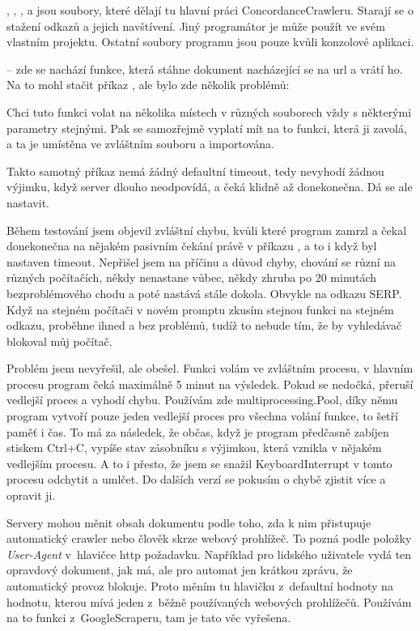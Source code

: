 \od 
{}, , ,  a 
jsou soubory, které dělají tu hlavní práci ConcordanceCrawleru. Starají se
o stažení odkazů a jejich navštívení. Jiný programátor je může použít ve
svém vlastním projektu. Ostatní soubory programu jsou pouze kvůli konzolové
aplikaci.

\od
{} -- zde se nachází funkce, která stáhne dokument
nacházející se na url a vrátí ho. Na to mohl stačit
příkaz , ale bylo zde několik problémů:

\bigskip
\odod
	Chci tuto funkci volat na několika místech v různých souborech vždy s
	některými parametry stejnými. Pak se samozřejmě vyplatí mít na to funkci,
	která ji zavolá, a ta je umístěna ve zvláštním souboru a importována.

\bigskip
\odod
	Takto samotný příkaz nemá žádný defaultní timeout, tedy nevyhodí žádnou
	výjimku, když server dlouho neodpovídá, a čeká klidně až donekonečna. Dá se ale
	nastavit.

	\bigskip
\odod
	Během testování jsem objevil zvláštní chybu, kvůli které program zamrzl
	a čekal donekonečna na nějakém pasivním čekání právě v příkazu
	, a to i když byl nastaven timeout.	Nepřišel jsem na příčinu
	a důvod chyby, chování se různí na různých počítačích, někdy nenastane
	vůbec, někdy zhruba po 20 minutách bezproblémového chodu a poté nastává
	stále dokola. Obvykle na odkazu SERP.  Když na stejném počítači v novém
	promptu zkusím stejnou funkci na stejném odkazu, proběhne ihned a bez
	problémů, tudíž to nebude tím, že by vyhledávač blokoval můj počítač.

\bigskip
\itemitem{}
	Problém jsem nevyřešil, ale obešel. Funkci volám ve zvláštním procesu,
	v hlavním procesu program čeká maximálně 5 minut na výsledek. Pokud se
	nedočká, přeruší vedlejší proces a vyhodí chybu. Používám
	zde multiprocessing.Pool, díky němu program vytvoří pouze jeden
	vedlejší proces pro všechna volání funkce, to šetří paměť i čas.
	To má za následek, že občas, když je program předčasně zabíjen stiskem
	Ctrl+C, vypíše stav zásobníku s výjimkou, která vznikla v nějakém
	vedlejším procesu. A to i přesto, že jsem se snažil KeyboardInterrupt
	v tomto procesu odchytit a umlčet. Do dalších verzí se pokusím o chybě
	zjistit více a opravit ji.

\bigskip
\odod
	Servery mohou měnit obsah dokumentu podle toho, zda k nim přistupuje
	automatický crawler nebo člověk skrze webový prohlížeč. To pozná podle
	položky {\it User-Agent} v~hlavičce http požadavku. Například pro
	lidského uživatele vydá ten opravdový dokument, jak má, ale pro automat
	jen krátkou zprávu, že automatický provoz blokuje. 
	Proto měním tu hlavičku z~defaultní hodnoty na hodnotu, kterou mívá jeden
	z~běžně používaných webových prohlížečů. Používám na to funkci
	z~GoogleScraperu, tam je tato věc vyřešena.

